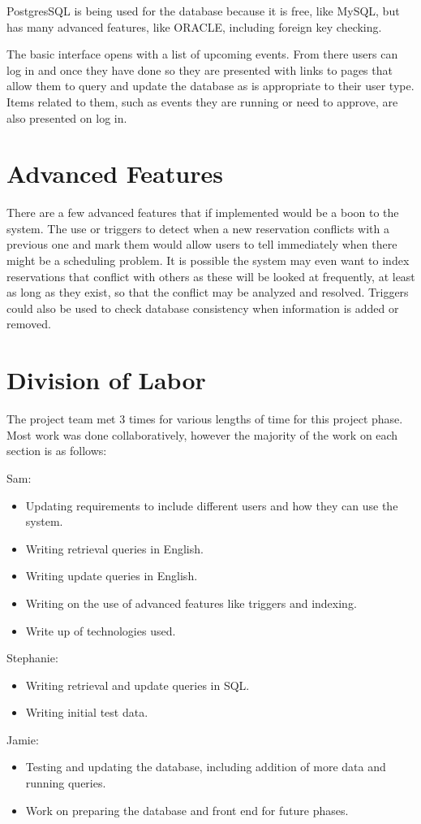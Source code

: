 \documentclass{article}
\begin{document}
PostgresSQL is being used for the database because it is free, like MySQL, but has many advanced features, like ORACLE,
including foreign key checking.

The basic interface opens with a list of upcoming events. From there users can log in and once they have done so they are presented
with links to pages that allow them to query and update the database as is appropriate to their user type. Items related to them,
such as events they are running or need to approve, are also presented on log in.


\section{Advanced Features}
There are a few advanced features that if implemented would be a boon to the system. The use or triggers to detect
when a new reservation conflicts with a previous one and mark them would allow users to tell immediately when there
might be a scheduling problem. It is possible the system may even want to index reservations that conflict with others
as these will be looked at frequently, at least as long as they exist, so that the conflict may be analyzed and resolved.
Triggers could also be used to check database consistency when information is added or removed.


\section{Division of Labor}
The project team met 3 times for various lengths of time for this project phase. Most work was done collaboratively,
however the majority of the work on each section is as follows:

Sam:
\begin{itemize}
\item Updating requirements to include different users and how they can use the system.
\item Writing retrieval queries in English.
\item Writing update queries in English.
\item Writing on the use of advanced features like triggers and indexing.
\item Write up of technologies used.
\end{itemize}

Stephanie:
\begin{itemize}
\item Writing retrieval and update queries in SQL.
\item Writing initial test data.
\end{itemize}

Jamie:
\begin{itemize}
\item Testing and updating the database, including addition of more data and running queries.
\item Work on preparing the database and front end for future phases.
\end{itemize}
\end{document}
